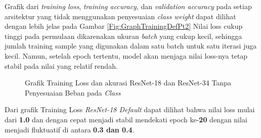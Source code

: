 Grafik dari \emph{training loss}, \emph{training accuracy}, dan \emph{validation accuracy} pada setiap arsitektur yang tidak menggunakan penyesuaian \emph{class weight} dapat dilihat dengan lebih jelas pada Gambar \ref{Fig:GraphTrainingDefPt2} Nilai loss cukup tinggi pada permulaan dikarenakan ukuran \emph{batch} yang cukup kecil, sehingga jumlah training sample yang digunakan dalam satu batch untuk satu iterasi juga kecil. Namun, setelah epoch tertentu, model akan menjaga nilai loss-nya tetap stabil pada nilai yang relatif rendah.
\pagebreak
\begin{figure}[hbtp]
	\centering
	\qquad
	\caption{Grafik Training Loss dan akurasi ResNet-18 dan ResNet-34 Tanpa Penyesuaian Beban pada \emph{Class}}
	\label{Fig:GraphTrainingDefPt1}
\end{figure}

Dari grafik Training Loss \emph{ResNet-18 Default} dapat dilihat bahwa nilai loss mulai dari \textbf{1.0} dan dengan cepat menjadi stabil mendekati epoch ke-\textbf{20} dengan nilai menjadi fluktuatif di antara \textbf{0.3 dan 0.4}.

